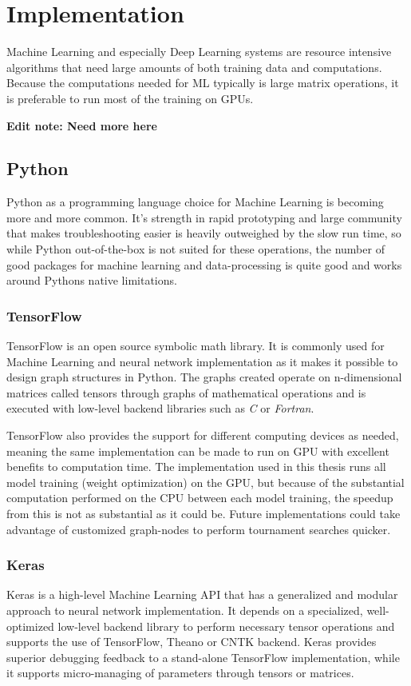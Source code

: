 \chapter{Implementation}
\label{implementation}
Machine Learning and especially Deep Learning systems are resource intensive algorithms that need large amounts of both training data and computations. Because the computations needed for ML typically is large matrix operations, it is preferable to run most of the training on GPUs.

\textbf{Edit note: Need more here}

\section{Python}
Python as a programming language choice for Machine Learning is becoming more and more common. It's strength in rapid prototyping and large community that makes troubleshooting easier is heavily outweighed by the slow run time, so while Python out-of-the-box is not suited for these operations, the number of good packages for machine learning and data-processing is quite good and works around Pythons native limitations. 

\subsection{TensorFlow}
TensorFlow\cite{tensorflow} is an open source symbolic math library. It is commonly used for Machine Learning and neural network implementation as it makes it possible to design graph structures in Python. The graphs created operate on n-dimensional matrices called tensors through graphs of mathematical operations and is executed with low-level backend libraries such as \textit{C} or \textit{Fortran}.

TensorFlow also provides the support for different computing devices as needed, meaning the same implementation can be made to run on GPU with excellent benefits to computation time. The implementation used in this thesis runs all model training (weight optimization) on the GPU, but because of the substantial computation performed on the CPU between each model training, the speedup from this is not as substantial as it could be. Future implementations could take advantage of customized graph-nodes to perform tournament searches quicker. 

\subsection{Keras}
Keras\cite{keras} is a high-level Machine Learning API that has a generalized and modular approach to neural network implementation. It depends on a specialized, well-optimized low-level backend library to perform necessary tensor operations and supports the use of TensorFlow, Theano or CNTK backend. Keras provides superior debugging feedback to a stand-alone TensorFlow implementation, while it supports micro-managing of parameters through tensors or matrices.

